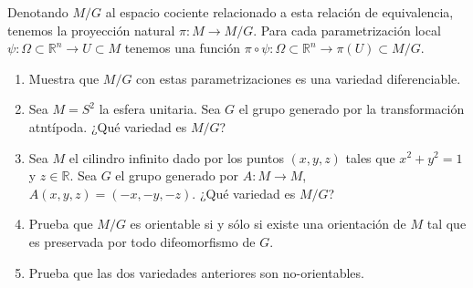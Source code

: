 \documentclass[spanish]{book}
\theoremstyle{definition}
\newcommand{\R}{\mathbb{R}}
\begin{document}
	Denotando $M/G$ al espacio cociente relacionado a esta relación de equivalencia, tenemos la proyección natural $\pi:M\to M/G$. Para cada parametrización local ${\psi:\Omega\subset\R^n\to U\subset M}$ tenemos una función $\pi\circ\psi:\Omega\subset\R^n\to\pi(U)\subset M/G$.
	\begin{enumerate}
		\item Muestra que $M/G$ con estas parametrizaciones es una variedad diferenciable.
		\item Sea $M=S^2$ la esfera unitaria. Sea $G$ el grupo generado por la transformación atntípoda. ¿Qué variedad es $M/G$?
		\item Sea $M$ el cilindro infinito dado por los puntos $(x,y,z)$ tales que $x^2+y^2=1$ y $z\in\R$. Sea $G$ el grupo generado por $A:M\to M$, $A(x,y,z)=(-x,-y,-z)$. ¿Qué variedad es $M/G$?
		\item Prueba que $M/G$ es orientable si y sólo si existe una orientación de $M$ tal que es preservada por todo difeomorfismo de $G$.
		\item Prueba que las dos variedades anteriores son no-orientables.
	\end{enumerate}
\end{document}
